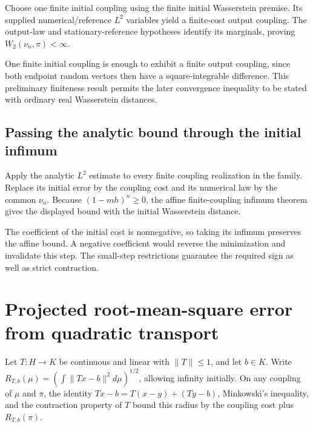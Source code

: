 \documentclass[11pt,a4paper]{report}
\begin{document}
Choose one finite initial coupling using the finite initial Wasserstein premise. Its supplied numerical/\allowbreak{}reference \(L^2\) variables yield a finite-cost output coupling. The output-law and stationary-reference hypotheses identify its marginals, proving \(W_2(\nu_n,\pi)<\infty\).



One finite initial coupling is enough to exhibit a finite output coupling, since both endpoint random vectors then have a square-integrable difference. This preliminary finiteness result permits the later convergence inequality to be stated with ordinary real Wasserstein distances.

\subsection{\texorpdfstring{Passing the analytic bound through the initial infimum}{Passing the analytic bound through the initial infimum}}
\label{report-step-UnadjustedLangevin-ReferenceFamily-lean-4}


Apply the analytic \(L^2\) estimate to every finite coupling realization in the family. Replace its initial error by the coupling cost and its numerical law by the common \(\nu_n\). Because \((1-mh)^n\ge0\), the affine finite-coupling infimum theorem gives the displayed bound with the initial Wasserstein distance.



The coefficient of the initial cost is nonnegative, so taking its infimum preserves the affine bound. A negative coefficient would reverse the minimization and invalidate this step. The small-step restrictions guarantee the required sign as well as strict contraction.

\section{\texorpdfstring{Projected root-mean-square error from quadratic transport}{Projected root-mean-square error from quadratic transport}}
\label{proof-module-UnadjustedLangevin-Projection-lean}


Let \(T:H\to K\) be continuous and linear with \(\|T\|\le1\), and let \(b\in K\). Write \(R_{T,b}(\mu)=(\int\|Tx-b\|^2d\mu)^{1/2}\), allowing infinity initially. On any coupling of \(\mu\) and \(\pi\), the identity \(Tx-b=T(x-y)+(Ty-b)\), Minkowski's inequality, and the contraction property of \(T\) bound this radius by the coupling cost plus \(R_{T,b}(\pi)\).
\end{document}
